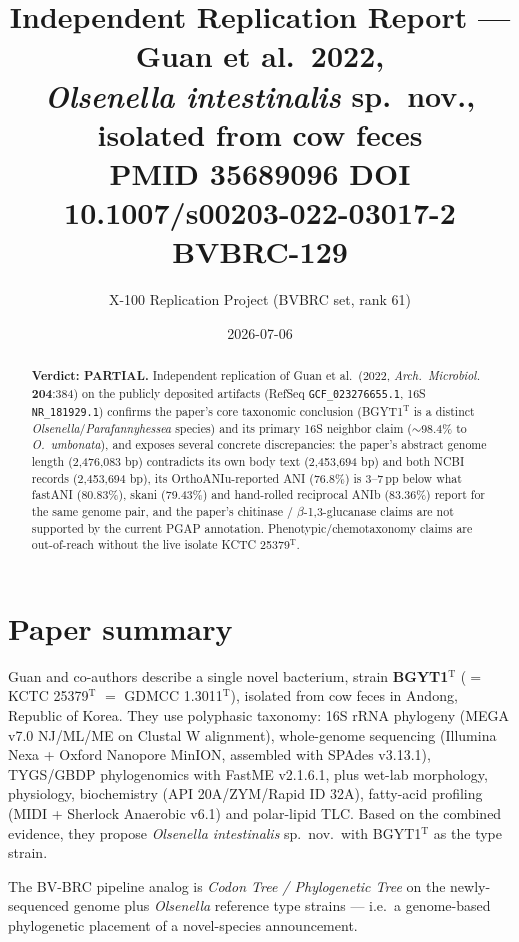 \documentclass[11pt]{article}
\title{Independent Replication Report --- Guan et al.\ 2022,\\
\emph{Olsenella intestinalis} sp.\ nov., isolated from cow feces\\
\large PMID 35689096 \textbullet{} DOI 10.1007/s00203-022-03017-2 \textbullet{} BVBRC-129}
\author{X-100 Replication Project (BVBRC set, rank 61)}
\date{2026-07-06}
\begin{document}
\maketitle

\begin{abstract}
\noindent\textbf{Verdict: PARTIAL.} Independent replication of Guan et al.\ (2022, \emph{Arch.\ Microbiol.} \textbf{204}:384) on the publicly deposited artifacts (RefSeq \texttt{GCF\_023276655.1}, 16S \texttt{NR\_181929.1}) confirms the paper's core taxonomic conclusion (BGYT1${}^{\mathrm{T}}$ is a distinct \emph{Olsenella}/\emph{Parafannyhessea} species) and its primary 16S neighbor claim ($\sim$98.4\% to \emph{O.\ umbonata}), and exposes several concrete discrepancies: the paper's abstract genome length (2{,}476{,}083 bp) contradicts its own body text (2{,}453{,}694 bp) and both NCBI records (2{,}453{,}694 bp), its OrthoANIu-reported ANI (76.8\%) is 3--7\,pp below what fastANI (80.83\%), skani (79.43\%) and hand-rolled reciprocal ANIb (83.36\%) report for the same genome pair, and the paper's chitinase / $\beta$-1,3-glucanase claims are not supported by the current PGAP annotation. Phenotypic/chemotaxonomy claims are out-of-reach without the live isolate KCTC 25379${}^{\mathrm{T}}$.
\end{abstract}

\section{Paper summary}

Guan and co-authors describe a single novel bacterium, strain \textbf{BGYT1${}^{\mathrm{T}}$} ($=$ KCTC 25379${}^{\mathrm{T}}$ $=$ GDMCC 1.3011${}^{\mathrm{T}}$), isolated from cow feces in Andong, Republic of Korea. They use polyphasic taxonomy: 16S rRNA phylogeny (MEGA v7.0 NJ/ML/ME on Clustal W alignment), whole-genome sequencing (Illumina Nexa + Oxford Nanopore MinION, assembled with SPAdes v3.13.1), TYGS/GBDP phylogenomics with FastME v2.1.6.1, plus wet-lab morphology, physiology, biochemistry (API 20A/ZYM/Rapid ID 32A), fatty-acid profiling (MIDI + Sherlock Anaerobic v6.1) and polar-lipid TLC. Based on the combined evidence, they propose \emph{Olsenella intestinalis} sp.\ nov.\ with BGYT1${}^{\mathrm{T}}$ as the type strain.

The BV-BRC pipeline analog is \emph{Codon Tree / Phylogenetic Tree} on the newly-sequenced genome plus \emph{Olsenella} reference type strains --- i.e.\ a genome-based phylogenetic placement of a novel-species announcement.
\end{document}
